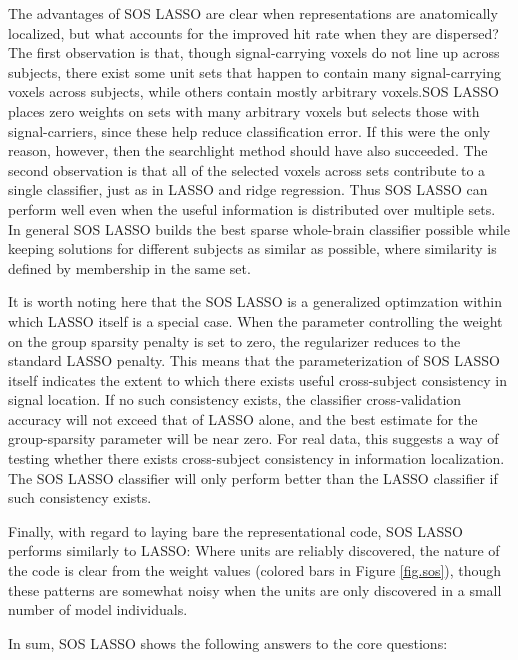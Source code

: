 The advantages of SOS LASSO are clear when representations are anatomically localized, but what accounts for the improved hit rate when they are dispersed? The first observation is that, though signal-carrying voxels do not line up across subjects, there exist some unit sets that happen to contain many signal-carrying voxels across subjects, while others contain mostly arbitrary voxels.SOS LASSO places zero weights on sets with many arbitrary voxels but selects those with signal-carriers, since these help reduce classification error. If this were the only reason, however, then the searchlight method should have also succeeded. The second observation is that all of the selected voxels across sets contribute to a single classifier, just as in LASSO and ridge regression. Thus SOS LASSO can perform well even when the useful information is distributed over multiple sets. In general SOS LASSO builds the best sparse whole-brain classifier possible while keeping solutions for different subjects as similar as possible, where similarity is defined by membership in the same set.

It is worth noting here that the SOS LASSO is a generalized optimzation within which LASSO itself is a special case. When the parameter controlling the weight on the group sparsity penalty is set to zero, the regularizer reduces to the standard LASSO penalty. This means that the parameterization of SOS LASSO itself indicates the extent to which there exists useful cross-subject consistency in signal location. If no such consistency exists, the classifier cross-validation accuracy will not exceed that of LASSO alone, and the best estimate for the group-sparsity parameter will be near zero. For real data, this suggests a way of testing whether there exists cross-subject consistency in information localization. The SOS LASSO classifier will only perform better than the LASSO classifier if such consistency exists.

Finally, with regard to laying bare the representational code, SOS LASSO performs similarly to LASSO: Where units are reliably discovered, the nature of the code is clear from the weight values (colored bars in Figure \ref{fig.sos}), though these patterns are somewhat noisy when the units are only discovered in a small number of model individuals.

In sum, SOS LASSO shows the following answers to the core questions: 


